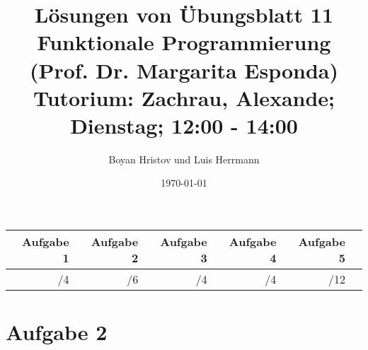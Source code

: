 \documentclass[11]{article}
\begin{document}
\title
{
L\"osungen von \"Ubungsblatt 11 \\
Funktionale Programmierung (Prof. Dr. Margarita Esponda) \\
\normalsize Tutorium: Zachrau, Alexande; Dienstag; 12:00 - 14:00
}
\author{Boyan Hristov und Luis Herrmann}
\date{\today}
\maketitle

\begin{tabular}{|r|r|r|r|r|r}
\hline 
Aufgabe 1 & Aufgabe 2 & Aufgabe 3 & Aufgabe 4 & Aufgabe 5\\ 
\hline 
/4 & /6 & /4 & /4 & /12\\ 
\hline 
\end{tabular}
%
\section*{Aufgabe 2}
\end{document}
